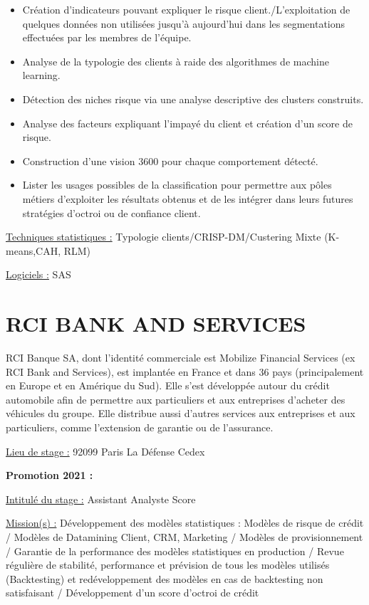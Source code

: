 \documentclass[
  letterpaper,
  DIV=11,
  numbers=noendperiod]{scrreprt}
\begin{document}
\begin{itemize}
\item
  Création d'indicateurs pouvant expliquer le risque
  client./L'exploitation de quelques données non utilisées jusqu'à
  aujourd'hui dans les segmentations effectuées par les membres de
  l'équipe.
\item
  Analyse de la typologie des clients à raide des algorithmes de machine
  learning.
\item
  Détection des niches risque via une analyse descriptive des clusters
  construits.
\item
  Analyse des facteurs expliquant l'impayé du client et création d'un
  score de risque.
\item
  Construction d'une vision 3600 pour chaque comportement détecté.
\item
  Lister les usages possibles de la classification pour permettre aux
  pôles métiers d'exploiter les résultats obtenus et de les intégrer
  dans leurs futures stratégies d'octroi ou de confiance client.
\end{itemize}

\uline{Techniques statistiques :} Typologie clients/CRISP-DM/Custering
Mixte (K-means,CAH, RLM)

\uline{Logiciels :} SAS

\hypertarget{rci-bank-and-services}{%
\section{\texorpdfstring{\textbf{RCI BANK AND
SERVICES}}{RCI BANK AND SERVICES}}\label{rci-bank-and-services}}

RCI Banque SA, dont l'identité commerciale est Mobilize Financial
Services (ex RCI Bank and Services), est implantée en France et dans 36
pays (principalement en Europe et en Amérique du Sud). Elle s'est
développée autour du crédit automobile afin de permettre aux
particuliers et aux entreprises d'acheter des véhicules du groupe. Elle
distribue aussi d'autres services aux entreprises et aux particuliers,
comme l'extension de garantie ou de l'assurance.

\uline{Lieu de stage :} 92099 Paris La Défense Cedex

\textbf{Promotion 2021 :}

\uline{Intitulé du stage :} Assistant Analyste Score

\uline{Mission(s) :} Développement des modèles statistiques : Modèles de
risque de crédit / Modèles de Datamining Client, CRM, Marketing /
Modèles de provisionnement / Garantie de la performance des modèles
statistiques en production / Revue régulière de stabilité, performance
et prévision de tous les modèles utilisés (Backtesting) et
redéveloppement des modèles en cas de backtesting non satisfaisant /
Développement d'un score d'octroi de crédit
\end{document}
